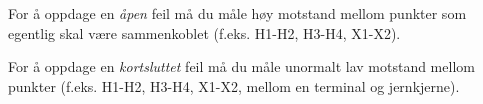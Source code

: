 






For å oppdage en \textit{åpen} feil må du måle høy motstand mellom punkter som egentlig skal være sammenkoblet (f.eks. H1-H2, H3-H4, X1-X2).

\vskip 10pt

For å oppdage en \textit{kortsluttet} feil må du måle unormalt lav motstand mellom punkter (f.eks. H1-H2, H3-H4, X1-X2, mellom en terminal og jernkjerne).


